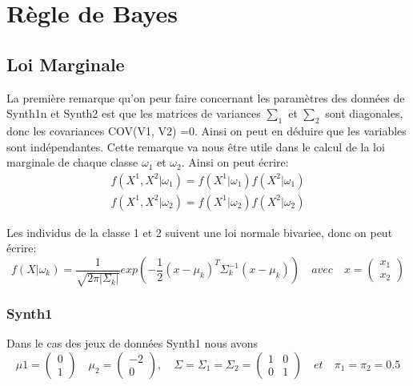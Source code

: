 \documentclass[10pt]{article}
\begin{document}
				
				
	
	\section{Règle de Bayes}
	\subsection{Loi Marginale}
	La première remarque qu'on peur faire concernant les paramètres des données de Synth1n et Synth2 est que les matrices de variances $\sum_{1}$ et $\sum_{2} $ sont diagonales, donc les covariances COV(V1, V2) =0. Ainsi on peut en déduire que les variables sont indépendantes. Cette remarque va nous être utile dans le calcul de la loi marginale de chaque classe $\omega_{1} $ et $ \omega_{2}$. Ainsi on peut écrire:
	\begin{equation}
	\begin{split}
		f(X^{1}, X^{2}| \omega_{1}) = f(X^{1}|\omega_{1})  f(X^{2}|\omega_{1})\\
		f(X^{1}, X^{2}| \omega_{2}) = f(X^{1}|\omega_{2})  f(X^{2}|\omega_{2})
		\end{split}
		\label{1}
	\end{equation}
	
Les individus de la classe 1 et 2 suivent une loi normale bivariee, donc on peut écrire: 
	\begin{equation}
f(X|\omega_{k}) = \frac{1}{\sqrt{2\pi|\Sigma_{k}|}} exp(-\frac{1}{2} (x-\mu_{k})^{T} \Sigma_{k}^{-1} (x-\mu_{k})) \quad avec \quad   x = \begin{pmatrix} x_{1} \\ x_{2} \end{pmatrix} 
	\label{2}
	\end{equation}

\subsubsection{Synth1}
Dans le cas des jeux de données Synth1 nous avons \[\mu{1}= \begin{pmatrix} 0 \\ 1 \end{pmatrix} \quad \mu_{2}= \begin{pmatrix} -2 \\ 0 \end{pmatrix}, \quad  \Sigma = \Sigma_{1} = \Sigma_{2} = \begin{pmatrix} 1 & 0 \\ 0 & 1	\end{pmatrix} \quad et  \quad \pi_{1} = \pi_{2} = 0.5\]
\end{document}

